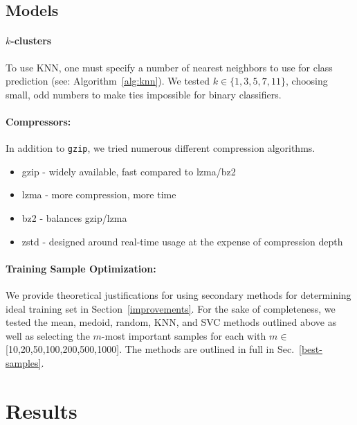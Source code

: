 \documentclass[sigconf]{acmart}
\begin{document}
\subsection{Models}

\paragraph{$k$-clusters}
To use KNN, one must specify a number of nearest neighbors to use for class prediction (see: Algorithm~\ref{alg:knn}). We tested $k \in \{1,3,5,7,11\}$, choosing small, odd numbers to make ties impossible for binary classifiers.
\paragraph{Compressors:} In addition to \texttt{gzip}, we tried numerous different compression algorithms. 
\begin{itemize}
    \item gzip - widely available, fast compared to lzma/bz2
    \item lzma - more compression, more time
    \item bz2 - balances gzip/lzma
    \item zstd - designed around real-time usage at the expense of compression depth
\end{itemize}

\paragraph{Training Sample Optimization:}
\label{methods}
We provide theoretical justifications for using secondary methods for determining ideal training set in Section~\ref{improvements}. For the sake of completeness, we tested the mean, medoid, random, KNN, and SVC methods outlined above as well as selecting the $m$-most important samples for each with $m \in$ [10,20,50,100,200,500,1000]. The methods are outlined in full in Sec.~\ref{best-samples}.


\section{Results}
\label{results}
\end{document}
